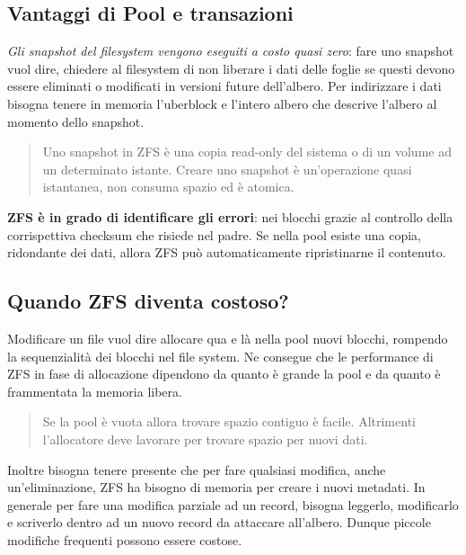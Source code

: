 \subsection{Vantaggi di Pool e
transazioni}\label{vantaggi-di-pool-e-transazioni}

\emph{Gli snapshot del filesystem vengono eseguiti a costo quasi zero}:
fare uno snapshot vuol dire, chiedere al filesystem di non liberare i
dati delle foglie se questi devono essere eliminati o modificati in
versioni future dell'albero. Per indirizzare i dati bisogna tenere in
memoria l'\(\text{uberblock}\) e l'intero albero che descrive l'albero
al momento dello snapshot.

\begin{quote}
Uno snapshot in ZFS è una copia read-only del sistema o di un volume ad
un determinato istante. Creare uno snapshot è un'operazione quasi
istantanea, non consuma spazio ed è atomica.
\end{quote}

\textbf{ZFS è in grado di identificare gli errori}: nei blocchi grazie
al controllo della corrispettiva checksum che risiede nel padre. Se
nella pool esiste una copia, ridondante dei dati, allora ZFS può
automaticamente ripristinarne il contenuto.

\subsection{Quando ZFS diventa
costoso?}\label{quando-zfs-diventa-costoso}

Modificare un file vuol dire allocare qua e là nella pool nuovi blocchi,
rompendo la sequenzialità dei blocchi nel file system. Ne consegue che
le performance di ZFS in fase di allocazione dipendono da quanto è
grande la pool e da quanto è frammentata la memoria libera.

\begin{quote}
Se la pool è vuota allora trovare spazio contiguo è facile. Altrimenti
l'allocatore deve lavorare per trovare spazio per nuovi dati.
\end{quote}

Inoltre bisogna tenere presente che per fare qualsiasi modifica, anche
un'eliminazione, ZFS ha bisogno di memoria per creare i nuovi metadati.
In generale per fare una modifica parziale ad un record, bisogna
leggerlo, modificarlo e scriverlo dentro ad un nuovo record da attaccare
all'albero. Dunque piccole modifiche frequenti possono essere costose.
